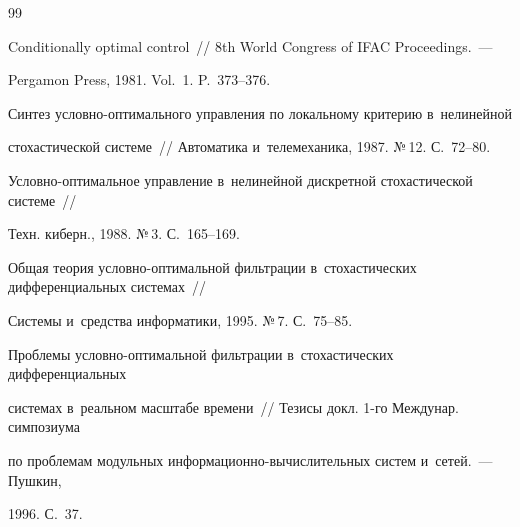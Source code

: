 {{\begin{thebibliography}{99}



Conditionally optimal control~/\!\!/ 8th World Congress of IFAC Proceedings.~--- 

Pergamon Press, 1981. Vol.~1. P.~373--376.






Синтез условно-оптимального управления по локальному критерию в~нелинейной 

стохастической сис\-те\-ме~/\!\!/ Автоматика и~телемеханика, 1987. №\,12. С.~72--80.






Условно-оптимальное управ\-ле\-ние в~нелинейной дискретной стохастической сис\-те\-ме~/\!\!/ 

Техн. киберн., 1988. №\,3. С.~165--169.










Общая теория услов\-но-оп\-ти\-маль\-ной фильт\-ра\-ции в~стохастических дифференциальных сис\-те\-мах~/\!\!/ 

Сис\-те\-мы и~средства информатики, 1995. №\,7. С.~75--85.








Проблемы услов\-но-оп\-ти\-маль\-ной фильт\-ра\-ции в~стохастических дифференциальных 

сис\-те\-мах в~реальном масштабе времени~/\!\!/ Тезисы докл. 1-го Междунар.  симпозиума 

по проблемам модульных ин\-фор\-ма\-ци\-он\-но-вы\-чис\-ли\-тель\-ных сис\-тем и~сетей.~--- Пушкин, 

1996. С.~37.





\end{thebibliography}}}
